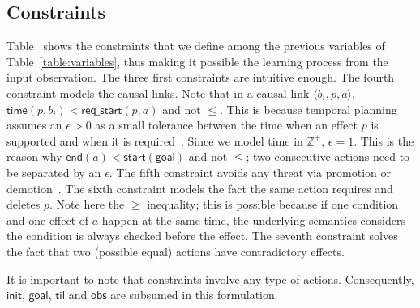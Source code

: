 \documentclass[runningheads]{llncs}
\newcommand{\tup}[1]{{\langle #1 \rangle}}
\newcommand{\obs}{\mathsf{obs}}    %
\newcommand{\start}{\mathsf{start}}%
\newcommand{\en}{\mathsf{end}}     %
\newcommand{\til}{\mathsf{til}}    %
\newcommand{\tim}{\mathsf{time}}   %
\newcommand{\reqs}{\mathsf{req\_{start}}} %
\newcommand{\ini}{\mathsf{init}}   %
\newcommand{\goal}{\mathsf{goal}}  %
\begin{document}
\subsection{Constraints}
Table~\label{table:constraints} shows the constraints that we define among the previous variables of Table~\ref{table:variables}, thus making it possible the learning process from the input observation.  The three first constraints are intuitive enough. The fourth constraint models the causal links. Note that in a causal link $\tup{b_i,p,a}$, $\tim(p,b_i) < \reqs(p,a)$ and not $\leq$. This is because temporal planning assumes an $\epsilon > 0$ as a small tolerance between the time when an effect $p$ is supported and when it is required~\cite{fox2003pddl2}. Since we model time in $\mathbb{Z}^+$, $\epsilon=1$. This is the reason why $\en(a) < \start(\goal)$ and not $\leq$; two consecutive actions need to be separated by an $\epsilon$.
The fifth constraint avoids any threat via promotion or demotion~\cite{ghallab2004automated}. The sixth constraint models the fact the same action requires and deletes $p$. Note here the $\geq$ inequality; this is possible because if one condition and one effect of $a$ happen at the same time, the underlying semantics considers the condition is always checked before the effect. The seventh constraint solves the fact that two (possible equal) actions have contradictory effects.

It is important to note that constraints involve any type of actions. Consequently, $\ini$, $\goal$, $\til$ and $\obs$ are subsumed in this formulation.
\end{document}
